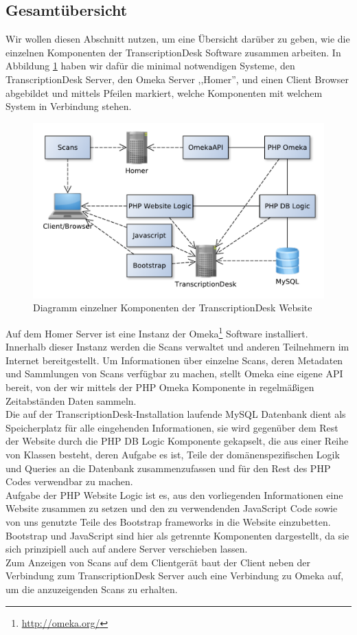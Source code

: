 \documentclass{article}
\begin{document}
\subsection{Gesamtübersicht}
Wir wollen diesen Abschnitt nutzen, um eine Übersicht darüber zu geben,
wie die einzelnen Komponenten der TranscriptionDesk Software zusammen arbeiten.
In Abbildung \ref{fig:components} haben wir dafür die minimal notwendigen Systeme,
den TranscriptionDesk Server, den Omeka Server ,,Homer'', und einen Client Browser abgebildet
und mittels Pfeilen markiert, welche Komponenten mit welchem System in Verbindung stehen.
\begin{figure}[H]
\includegraphics[width=\textwidth]{../notes/components.pdf}
\caption{Diagramm einzelner Komponenten der TranscriptionDesk Website}
\label{fig:components}
\end{figure}
Auf dem Homer Server ist eine Instanz der Omeka\footnote{\url{http://omeka.org/}} Software installiert.
Innerhalb dieser Instanz werden die Scans verwaltet und anderen Teilnehmern im Internet bereitgestellt.
Um Informationen über einzelne Scans, deren Metadaten und Sammlungen von Scans verfügbar zu machen,
stellt Omeka eine eigene API bereit, von der wir mittels der PHP Omeka Komponente in regelmäßigen Zeitabständen Daten sammeln.\\
Die auf der TranscriptionDesk-Installation laufende MySQL Datenbank dient als Speicherplatz für alle eingehenden Informationen,
sie wird gegenüber dem Rest der Website durch die PHP DB Logic Komponente gekapselt,
die aus einer Reihe von Klassen besteht, deren Aufgabe es ist,
Teile der domänenspezifischen Logik und Queries an die Datenbank zusammenzufassen
und für den Rest des PHP Codes verwendbar zu machen.\\
Aufgabe der PHP Website Logic ist es, aus den vorliegenden Informationen eine Website zusammen zu setzen
und den zu verwendenden JavaScript Code sowie von uns genutzte Teile des Bootstrap frameworks in die Website einzubetten.
Bootstrap und JavaScript sind hier als getrennte Komponenten dargestellt,
da sie sich prinzipiell auch auf andere Server verschieben lassen.\\
Zum Anzeigen von Scans auf dem Clientgerät baut der Client neben der Verbindung zum TranscriptionDesk Server auch eine Verbindung zu Omeka auf,
um die anzuzeigenden Scans zu erhalten.
\end{document}
